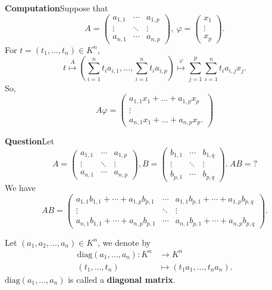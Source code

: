 \documentclass{book}
\numberwithin{equation}{section}
\begin{document}
\begin{box2}
\textbf{Computation}\quad Suppose that 
$$A=\begin{pmatrix}  
  a_{1,1} & \cdots & a_{1,p} \\  
  \vdots & \ddots & \vdots \\  
  a_{n,1} & \cdots & a_{n,p}  
\end{pmatrix} ,\ \varphi =\begin{pmatrix}
 x_1\\
 \vdots\\
x_p

\end{pmatrix}.$$
For $t=(t_1, \dots, t_n)\in K^n$, 
$$t\overset{A}{\longmapsto}\left(\sum_{i=1}^{n}t_ia_{i,1},\dots,\sum_{i=1}^{n}t_ia_{i,p} \right)\overset{\varphi}{\longmapsto}\sum_{j=1}^{p}\sum_{i=1}^{n}t_ia_{i,j}x_j.$$
So, 
$$A\varphi=\begin{pmatrix}
    a_{1,1}x_1+\dots+a_{1,p}x_p\\
    \vdots\\
    a_{n,1}x_1+\dots+a_{n,p}x_p.
\end{pmatrix}$$
\end{box2}
\begin{box2}
    \textbf{Question}\quad Let 
    $$A=\begin{pmatrix}  
  a_{1,1} & \cdots & a_{1,p} \\  
  \vdots & \ddots & \vdots \\  
  a_{n,1} & \cdots & a_{n,p}  
\end{pmatrix} ,B=\begin{pmatrix}  
  b_{1,1} & \cdots & b_{1,q} \\  
  \vdots & \ddots & \vdots \\  
  b_{p,1} & \cdots & b_{p,q}  
\end{pmatrix} . \ AB=? $$
    We have
    $$AB=\begin{pmatrix}  
  a_{1,1}b_{1,1}+\cdots+a_{1,p}b_{p,1} & \cdots & a_{1,1}b_{p,1}+\cdots+a_{1,p}b_{p,q} \\  
  \vdots & \ddots & \vdots \\  
  a_{n,1}b_{1,1}+\cdots+a_{n,p}b_{p,1} & \cdots & a_{n,1}b_{p,1}+\cdots+a_{n,p}b_{p,q}  
\end{pmatrix} .$$
\end{box2}
\begin{exampleenv}
    Let $(a_1,a_2,\dots,a_n)\in K^n$, we denote by 
    \begin{align*}
        \mathrm{diag}(a_1,\dots,a_n):K^n&\longrightarrow K^n\\
        (t_1,\dots,t_n)&\longmapsto(t_1a_1,\dots,t_na_n).
    \end{align*}
    $\mathrm{diag}(a_1,\dots,a_n)$ is called a \textbf{diagonal matrix}.
\end{exampleenv}
\end{document}
